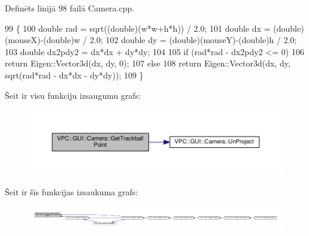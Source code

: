 Definēts līnijā 98 failā Camera.\+cpp.


\begin{DoxyCode}
99 \{
100     \textcolor{keywordtype}{double} rad = sqrt((\textcolor{keywordtype}{double})(w*w+h*h)) / 2.0;
101     \textcolor{keywordtype}{double} dx = (double)(mouseX)-(double)w / 2.0;
102     \textcolor{keywordtype}{double} dy = (double)(mouseY)-(double)h / 2.0;
103     \textcolor{keywordtype}{double} dx2pdy2 = dx*dx + dy*dy;
104 
105     \textcolor{keywordflow}{if} (rad*rad - dx2pdy2 <= 0)
106         \textcolor{keywordflow}{return} Eigen::Vector3d(dx, dy, 0);
107     \textcolor{keywordflow}{else}
108         \textcolor{keywordflow}{return} Eigen::Vector3d(dx, dy, sqrt(rad*rad - dx*dx - dy*dy));
109 \}
\end{DoxyCode}


Šeit ir visu funkciju izsaugumu grafs\+:
\nopagebreak
\begin{figure}[H]
\begin{center}
\leavevmode
\includegraphics[width=350pt]{class_v_p_c_1_1_g_u_i_1_1_camera_acf91e9c32fceb9143c7dd41d45ccafca_cgraph}
\end{center}
\end{figure}




Šeit ir šīs funkcijas izsaukuma grafs\+:
\nopagebreak
\begin{figure}[H]
\begin{center}
\leavevmode
\includegraphics[width=350pt]{class_v_p_c_1_1_g_u_i_1_1_camera_acf91e9c32fceb9143c7dd41d45ccafca_icgraph}
\end{center}
\end{figure}


